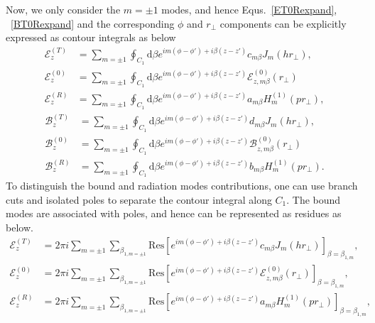 \documentclass[]{report}
\begin{document}
Now, we only consider the $ m=\pm 1 $ modes, and hence Equs.~\ref{ET0Rexpand}, ~\ref{BT0Rexpand} and the corresponding $ \phi $ and $ r\!_\perp $ components can be explicitly expressed as contour integrals as below
\begin{subequations}\label{ET0RC1}
\begin{align}
\mathcal{E}^{(T)}_z &= \sum_{m=\pm 1} \oint_{C_1} \mathrm{d}\beta e^{im(\phi-\phi') + i\beta (z-z')} c_{m\beta} J_m (hr\!_\perp),\\
\mathcal{E}^{(0)}_{z} &= \sum_{m=\pm 1} \oint_{C_1} \mathrm{d}\beta e^{im(\phi-\phi') + i\beta (z-z')} \mathcal{E}^{(0)}_{z,m\beta}(r\!_\perp)\\
\mathcal{E}^{(R)}_z &= \sum_{m=\pm 1} \oint_{C_1} \mathrm{d}\beta e^{im(\phi-\phi') + i\beta (z-z')} a_{m\beta} H_m^{(1)} (pr\!_\perp),
\end{align}
\end{subequations}
\begin{subequations}\label{BT0RC1}
\begin{align}
\mathcal{B}^{(T)}_z &= \sum_{m=\pm 1} \oint_{C_1} \mathrm{d}\beta e^{im(\phi-\phi') + i\beta (z-z')} d_{m\beta} J_m (hr\!_\perp),\\
\mathcal{B}^{(0)}_{z} &= \sum_{m=\pm 1} \oint_{C_1} \mathrm{d}\beta e^{im(\phi-\phi') + i\beta (z-z')} \mathcal{B}^{(0)}_{z,m\beta}(r\!_\perp)\\
\mathcal{B}^{(R)}_z &= \sum_{m=\pm 1} \oint_{C_1} \mathrm{d}\beta e^{im(\phi-\phi') + i\beta (z-z')} b_{m\beta} H_m^{(1)} (pr\!_\perp).
\end{align}
\end{subequations}
To distinguish the bound and radiation modes contributions, one can use branch cuts and isolated poles to separate the contour integral along $ C_1 $. The bound modes are associated with poles, and hence can be represented as residues as below. 
\begin{subequations}\label{ET0RRes}
\begin{align}
\mathcal{E}^{(T)}_z &= 2\pi i \sum_{m=\pm 1} \sum_{\beta_{1,m=\pm 1}}\mathrm{Res}\left[  e^{im(\phi\!-\!\phi') + i\beta (z\!-\!z')} c_{m\beta} J_m (hr\!_\perp)\right]_{\beta=\beta_{1,m}},\\
\mathcal{E}^{(0)}_{z} &= 2\pi i \sum_{m=\pm 1} \sum_{\beta_{1,m=\pm 1}}\mathrm{Res}\left[  e^{im(\phi-\phi') + i\beta (z-z')} \mathcal{E}^{(0)}_{z,m\beta}(r\!_\perp)\right]_{\beta=\beta_{1,m}},\\
\mathcal{E}^{(R)}_z &= 2\pi i \sum_{m=\pm 1} \sum_{\beta_{1,m=\pm 1}}\mathrm{Res}\left[ e^{im(\phi\!-\!\phi') + i\beta (z\!-\!z')} a_{m\beta} H_m^{(1)} (pr\!_\perp)\right]_{\beta=\beta_{1,m}},
\end{align}
\end{subequations}
\end{document}
